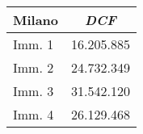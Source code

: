 \begin{tabular}[c]{|l||c|}
\hline
{\bfseries Milano} & {\bfseries \textit{DCF}} \\
\hline \hline
Imm. 1 & 16.205.885 \\
\hline
Imm. 2 & 24.732.349 \\
\hline
Imm. 3 & 31.542.120 \\
\hline
Imm. 4 & 26.129.468 \\
\hline
\end{tabular}